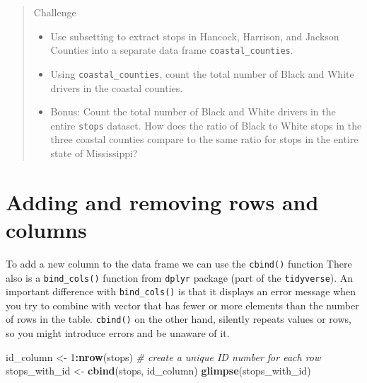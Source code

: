 \documentclass[
]{book}
\newenvironment{Shaded}{\begin{snugshade}}{\end{snugshade}}
\newcommand{\CommentTok}[1]{\textcolor[rgb]{0.56,0.35,0.01}{\textit{#1}}}
\newcommand{\DecValTok}[1]{\textcolor[rgb]{0.00,0.00,0.81}{#1}}
\newcommand{\FunctionTok}[1]{\textcolor[rgb]{0.13,0.29,0.53}{\textbf{#1}}}
\newcommand{\NormalTok}[1]{#1}
\newcommand{\OtherTok}[1]{\textcolor[rgb]{0.56,0.35,0.01}{#1}}
\newcommand{\SpecialCharTok}[1]{\textcolor[rgb]{0.81,0.36,0.00}{\textbf{#1}}}
\providecommand{\tightlist}{%
  \setlength{\itemsep}{0pt}\setlength{\parskip}{0pt}}
\begin{document}
\begin{quote}
Challenge

\begin{itemize}
\tightlist
\item
  Use subsetting to extract stops in Hancock, Harrison, and Jackson Counties into a separate data frame \texttt{coastal\_counties}.
\item
  Using \texttt{coastal\_counties}, count the total number of Black and White drivers in the coastal counties.
\item
  Bonus: Count the total number of Black and White drivers in the entire \texttt{stops} dataset. How does the ratio of Black to White stops in the three coastal counties compare to the same ratio for stops in the entire state of Mississippi?
\end{itemize}
\end{quote}

\section{Adding and removing rows and columns}\label{adding-and-removing-rows-and-columns}

To add a new column to the data frame we can use the \texttt{cbind()} function There also is a \texttt{bind\_cols()} function from \texttt{dplyr} package (part of the \texttt{tidyverse}). An important difference with \texttt{bind\_cols()} is that it displays an error message when you try to combine with vector that has fewer or more elements than the number of rows in the table. \texttt{cbind()} on the other hand, silently repeats values or rows, so you might introduce errors and be unaware of it.

\begin{Shaded}
\begin{Highlighting}[]
\NormalTok{id\_column }\OtherTok{\textless{}{-}} \DecValTok{1}\SpecialCharTok{:}\FunctionTok{nrow}\NormalTok{(stops) }\CommentTok{\# create a unique ID number for each row}
\NormalTok{stops\_with\_id }\OtherTok{\textless{}{-}} \FunctionTok{cbind}\NormalTok{(stops, id\_column) }
\FunctionTok{glimpse}\NormalTok{(stops\_with\_id)}
\end{Highlighting}
\end{Shaded}
\end{document}
